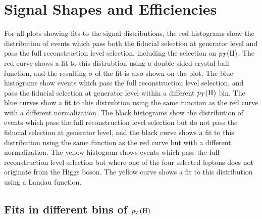 \section{Signal Shapes and Efficiencies}
\label{signalinputs}
 For all plots showing fits to the signal distributions, the red histograms show the distribution of events which pass both the fiducial selection at generator level and pass the full reconstruction level selection, including the selection on $p_T(\mathrm{H})$. The red curve shows a fit to this distrubtion using a double-sided crystal ball function, and the resulting $\sigma$ of the fit is also shown on the plot. The blue histograms show events which pass the full reconstruction level selection, and pass the fiducial selection at generator level within a different $p_T(\mathrm{H})$ bin. The blue curves show a fit to this distrubtion using the same function as the red curve with a different normalization. The black histograms show the distribution of events which pass the full reconstruction level selection but do not pass the fiducial selection at generator level, and the black curve shows a fit to this distribution using the same function as the red curve but with a different normalization. The yellow histogram shows events which pass the full reconstruction level selection but where one of the four selected leptons does not originate from the Higgs boson. The yellow curve shows a fit to this distribution using a Landau function.
 
\subsection[Differential bins - Higgs boson transverse momentum]{Fits in different bins of $p_T(\mathrm{H})$ }

